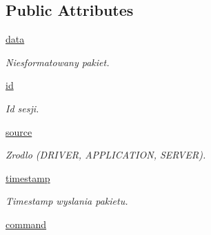 \subsection*{Public Attributes}
\begin{CompactItemize}
\item 
\hypertarget{class_serv_1_1_packet_1_1_packet_1_1_communicates_df67971c4f2032b13968383b398e91e9}{
\hyperlink{class_serv_1_1_packet_1_1_packet_1_1_communicates_df67971c4f2032b13968383b398e91e9}{data}}
\label{class_serv_1_1_packet_1_1_packet_1_1_communicates_df67971c4f2032b13968383b398e91e9}

\begin{CompactList}\small\item\em Niesformatowany pakiet. \item\end{CompactList}\item 
\hypertarget{class_serv_1_1_packet_1_1_packet_1_1_communicates_3d8e3873980a5c8db06ba14c35fa2e47}{
\hyperlink{class_serv_1_1_packet_1_1_packet_1_1_communicates_3d8e3873980a5c8db06ba14c35fa2e47}{id}}
\label{class_serv_1_1_packet_1_1_packet_1_1_communicates_3d8e3873980a5c8db06ba14c35fa2e47}

\begin{CompactList}\small\item\em Id sesji. \item\end{CompactList}\item 
\hypertarget{class_serv_1_1_packet_1_1_packet_1_1_communicates_803391cf774971e1eda05634f53f99a3}{
\hyperlink{class_serv_1_1_packet_1_1_packet_1_1_communicates_803391cf774971e1eda05634f53f99a3}{source}}
\label{class_serv_1_1_packet_1_1_packet_1_1_communicates_803391cf774971e1eda05634f53f99a3}

\begin{CompactList}\small\item\em Zrodlo (DRIVER, APPLICATION, SERVER). \item\end{CompactList}\item 
\hypertarget{class_serv_1_1_packet_1_1_packet_1_1_communicates_1f8def2866410dc8d2c8d0b784d36ecb}{
\hyperlink{class_serv_1_1_packet_1_1_packet_1_1_communicates_1f8def2866410dc8d2c8d0b784d36ecb}{timestamp}}
\label{class_serv_1_1_packet_1_1_packet_1_1_communicates_1f8def2866410dc8d2c8d0b784d36ecb}

\begin{CompactList}\small\item\em Timestamp wyslania pakietu. \item\end{CompactList}\item 
\hypertarget{class_serv_1_1_packet_1_1_packet_1_1_communicates_6fdf8dc95b792cf1982ad2a120cb3d4c}{
\hyperlink{class_serv_1_1_packet_1_1_packet_1_1_communicates_6fdf8dc95b792cf1982ad2a120cb3d4c}{command}}
\label{class_serv_1_1_packet_1_1_packet_1_1_communicates_6fdf8dc95b792cf1982ad2a120cb3d4c}


\end{CompactItemize}
